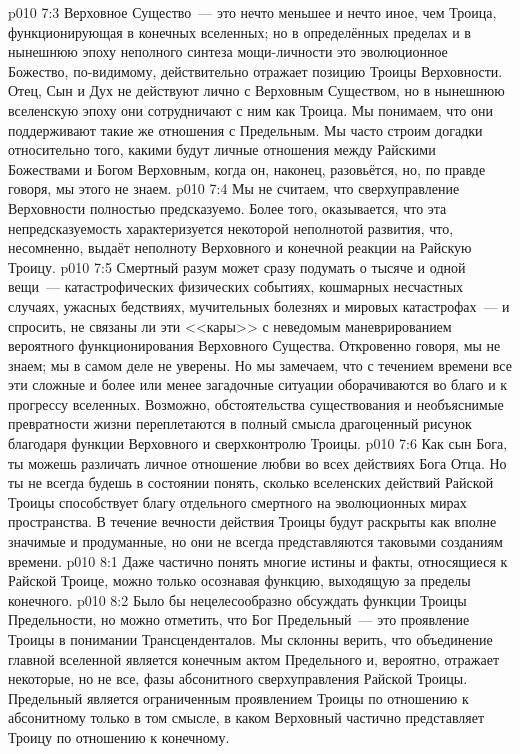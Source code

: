 \vs p010 7:3 Верховное Существо~--- это нечто меньшее и нечто иное, чем Троица, функционирующая в конечных вселенных; но в определённых пределах и в нынешнюю эпоху неполного синтеза мощи\hyp{}личности это эволюционное Божество, по\hyp{}видимому, действительно отражает позицию Троицы Верховности. Отец, Сын и Дух не действуют лично с Верховным Существом, но в нынешнюю вселенскую эпоху они сотрудничают с ним как Троица. Мы понимаем, что они поддерживают такие же отношения с Предельным. Мы часто строим догадки относительно того, какими будут личные отношения между Райскими Божествами и Богом Верховным, когда он, наконец, разовьётся, но, по правде говоря, мы этого не знаем.
\vs p010 7:4 \pc Мы не считаем, что сверхуправление Верховности полностью предсказуемо. Более того, оказывается, что эта непредсказуемость характеризуется некоторой неполнотой развития, что, несомненно, выдаёт неполноту Верховного и конечной реакции на Райскую Троицу.
\vs p010 7:5 Смертный разум может сразу подумать о тысяче и одной вещи~--- катастрофических физических событиях, кошмарных несчастных случаях, ужасных бедствиях, мучительных болезнях и мировых катастрофах~--- и спросить, не связаны ли эти <<кары>> с неведомым маневрированием вероятного функционирования Верховного Существа. Откровенно говоря, мы не знаем; мы в самом деле не уверены. Но мы замечаем, что с течением времени все эти сложные и более или менее загадочные ситуации  оборачиваются во благо и к прогрессу вселенных. Возможно, обстоятельства существования и необъяснимые превратности жизни переплетаются в полный смысла драгоценный рисунок благодаря функции Верховного и сверхконтролю Троицы.
\vs p010 7:6 Как сын Бога, ты можешь различать личное отношение любви во всех действиях Бога Отца. Но ты не всегда будешь в состоянии понять, сколько вселенских действий Райской Троицы способствует благу отдельного смертного на эволюционных мирах пространства. В течение вечности действия Троицы будут раскрыты как вполне значимые и продуманные, но они не всегда представляются таковыми созданиям времени.
\vs p010 8:1 Даже частично понять многие истины и факты, относящиеся к Райской Троице, можно только осознавая функцию, выходящую за пределы конечного.
\vs p010 8:2 Было бы нецелесообразно обсуждать функции Троицы Предельности, но можно отметить, что Бог Предельный~--- это проявление Троицы в понимании Трансценденталов. Мы склонны верить, что объединение главной вселенной является конечным актом Предельного и, вероятно, отражает некоторые, но не все, фазы абсонитного сверхуправления Райской Троицы. Предельный является ограниченным проявлением Троицы по отношению к абсонитному только в том смысле, в каком Верховный частично представляет Троицу по отношению к конечному.
